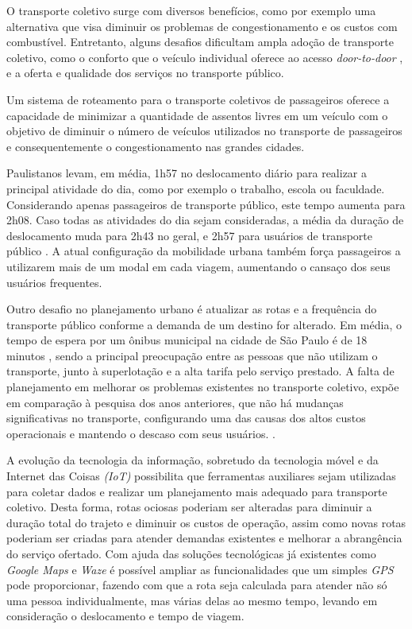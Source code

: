 O transporte coletivo surge com diversos benefícios, como por exemplo uma alternativa que visa diminuir os problemas de congestionamento e os custos com combustível. Entretanto, alguns desafios dificultam ampla adoção de transporte coletivo, como o conforto que o veículo individual oferece ao acesso \emph{door-to-door} \cite{FURUHATA201328}, e a oferta e qualidade dos serviços no transporte público.

Um sistema de roteamento para o transporte coletivos de passageiros oferece a capacidade de minimizar a quantidade de assentos livres em um veículo com o objetivo de diminuir o número de veículos utilizados no transporte de passageiros e consequentemente o congestionamento nas grandes cidades. \cite{MOURAD2019323}

Paulistanos levam, em média, 1h57 no deslocamento diário para realizar a principal atividade do dia, como por exemplo o trabalho, escola ou faculdade. Considerando apenas passageiros de transporte público, este tempo aumenta para 2h08. Caso todas as atividades do dia sejam consideradas, a média da duração de deslocamento muda para 2h43 no geral, e 2h57 para usuários de transporte público \cite{viveremsp}. A atual configuração da mobilidade urbana também força passageiros a utilizarem mais de um modal em cada viagem, aumentando o cansaço dos seus usuários frequentes.

Outro desafio no planejamento urbano é atualizar as rotas e a frequência do transporte público conforme a demanda de um destino for alterado. Em média, o tempo de espera por um ônibus municipal na cidade de São Paulo é de 18 minutos \cite{viveremsp}, sendo a principal preocupação entre as pessoas que não utilizam o transporte, junto à superlotação e a alta tarifa pelo serviço prestado. A falta de planejamento em melhorar os problemas existentes no transporte coletivo, expõe em comparação à pesquisa dos anos anteriores, que não há mudanças significativas no transporte, configurando uma das causas dos altos custos operacionais e mantendo o descaso com seus usuários. \cite{viveremsp}.

A evolução da tecnologia da informação, sobretudo da tecnologia móvel e da Internet das Coisas \emph{(IoT)} possibilita que ferramentas auxiliares sejam utilizadas para coletar dados e realizar um planejamento mais adequado para transporte coletivo. Desta forma, rotas ociosas poderiam ser alteradas para diminuir a duração total do trajeto e diminuir os custos de operação, assim como novas rotas poderiam ser criadas para atender demandas existentes e melhorar a abrangência do serviço ofertado. Com ajuda das soluções tecnológicas já existentes como \emph{Google Maps} e \emph{Waze} é possível ampliar as funcionalidades que um simples \emph{GPS} pode proporcionar, fazendo com que a rota seja calculada para atender não só uma pessoa individualmente, mas várias delas ao mesmo tempo, levando em consideração o deslocamento e tempo de viagem.

